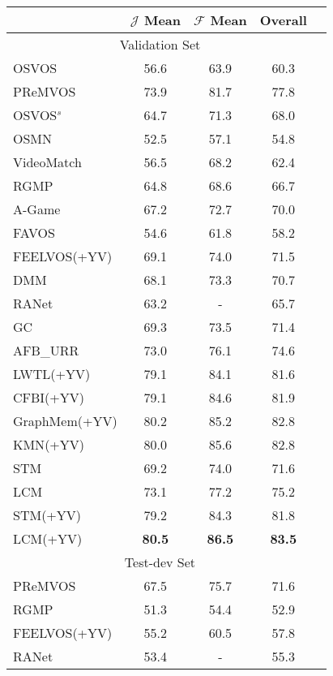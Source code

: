 \documentclass[final]{cvpr}
\begin{document}
\begin{table}
	\centering
	\begin{center}
\begin{tabular}{lcccc} 

\hline
  & $\mathcal{J}$ Mean & $\mathcal{F}$ Mean & Overall \\
\hline
 \multicolumn{4}{c}{Validation Set} \\
\hline
OSVOS\cite{osvos}  & 56.6 &  63.9 &  60.3 \\
PReMVOS\cite{premvos}  & 73.9 & 81.7 & 77.8 \\
OSVOS$^s$\cite{osvos_s}  &  64.7 &  71.3 &  68.0 \\
OSMN\cite{osmn}   & 52.5 &  57.1 & 54.8   \\
VideoMatch\cite{videomatch}   & 56.5  &  68.2 & 62.4   \\

RGMP\cite{rgmp}   & 64.8 & 68.6 &  66.7 \\
A-Game\cite{agame}  &  67.2 & 72.7 & 70.0 \\
FAVOS\cite{favos}  &  54.6 &  61.8 &  58.2 \\
FEELVOS\cite{feelvos}(+YV)     & 69.1 &  74.0 &  71.5 \\
DMM\cite{dmmnet}     &  68.1 &  73.3 &  70.7 \\
RANet\cite{ranet}      &  63.2 &  - &  65.7 \\ 

GC\cite{GC}  & 69.3 & 73.5 & 71.4 \\
AFB\_URR\cite{AFB_URR}  & 73.0 & 76.1 &  74.6 \\
LWTL\cite{LWTL}(+YV)   &  79.1  & 84.1 & 81.6 \\
CFBI\cite{cfbi}(+YV)   &  79.1 &  84.6 &  81.9 \\

GraphMem\cite{GraphMem}(+YV)  & 80.2 & 85.2 & 82.8 \\
KMN\cite{KMN}(+YV)    &  80.0 & 85.6 &  82.8 \\

\hline
STM\cite{STM}    & 69.2  &  74.0  &  71.6   \\
LCM       & 73.1  &  77.2  & 75.2 \\
\hline
STM\cite{STM}(+YV)   & 79.2 & 84.3 &  81.8 \\ 
LCM(+YV)      & \textbf{80.5} &  \textbf{86.5} &  \textbf{83.5} \\
\hline
 \multicolumn{4}{c}{Test-dev Set} \\
\hline
PReMVOS\cite{premvos}  & 67.5 & 75.7 & 71.6 \\
RGMP\cite{rgmp}   & 51.3 & 54.4 & 52.9 \\
FEELVOS\cite{feelvos}(+YV)   &  55.2 & 60.5 &  57.8 \\
RANet\cite{ranet}      &  53.4  & -    & 55.3 \\


\end{tabular}
\end{center}
\end{table}
\end{document}
